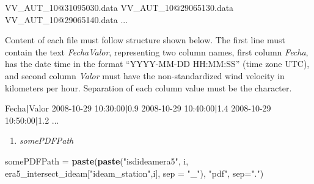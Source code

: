 \documentclass[12pt,twoside]{reedthesis}
\newenvironment{Shaded}{\begin{snugshade}}{\end{snugshade}}
\newcommand{\DataTypeTok}[1]{\textcolor[rgb]{0.13,0.29,0.53}{#1}}
\newcommand{\ExtensionTok}[1]{#1}
\newcommand{\KeywordTok}[1]{\textcolor[rgb]{0.13,0.29,0.53}{\textbf{#1}}}
\newcommand{\NormalTok}[1]{#1}
\newcommand{\StringTok}[1]{\textcolor[rgb]{0.31,0.60,0.02}{#1}}
\providecommand{\tightlist}{%
  \setlength{\itemsep}{0pt}\setlength{\parskip}{0pt}}
\begin{document}
\scriptsize

\vspace{0.4cm}
\begin{Shaded}
\begin{Highlighting}[]
      \ExtensionTok{VV_AUT_10@31095030.data}
      \ExtensionTok{VV_AUT_10@29065130.data}
      \ExtensionTok{VV_AUT_10@29065140.data}
      \ExtensionTok{...}
\end{Highlighting}
\end{Shaded}
\normalsize

Content of each file must follow structure shown below. The first line must contain the text \emph{Fecha\textbar Valor}, representing two column names, first column \emph{Fecha}, has the date time in the format ``YYYY-MM-DD HH:MM:SS'' (time zone UTC), and second column \emph{Valor} must have the non-standardized wind velocity in kilometers per hour. Separation of each column value must be the \emph{\textbar{}} character.

\scriptsize

\vspace{0.4cm}
\begin{Shaded}
\begin{Highlighting}[]
      \ExtensionTok{Fecha}\KeywordTok{|}\ExtensionTok{Valor}
      \ExtensionTok{2008-10-29}\NormalTok{ 10:30:00}\KeywordTok{|}\ExtensionTok{0.9}
      \ExtensionTok{2008-10-29}\NormalTok{ 10:40:00}\KeywordTok{|}\ExtensionTok{1.4}
      \ExtensionTok{2008-10-29}\NormalTok{ 10:50:00}\KeywordTok{|}\ExtensionTok{1.2}
      \ExtensionTok{...}
\end{Highlighting}
\end{Shaded}
\normalsize
\begin{enumerate}
\def\labelenumi{\arabic{enumi}.}
\setcounter{enumi}{5}
\tightlist
\item
  \emph{somePDFPath}
\end{enumerate}
\scriptsize

\vspace{0.4cm}
\begin{Shaded}
\begin{Highlighting}[]
\NormalTok{      somePDFPath =}\StringTok{ }\KeywordTok{paste}\NormalTok{(}\KeywordTok{paste}\NormalTok{(}\StringTok{"isdideamera5"}\NormalTok{, i, era5_intersect_ideam[}\StringTok{"ideam_station"}\NormalTok{,i], }\DataTypeTok{sep =} \StringTok{"_"}\NormalTok{), }
                          \StringTok{"pdf"}\NormalTok{, }\DataTypeTok{sep=}\StringTok{"."}\NormalTok{)}
\end{Highlighting}
\end{Shaded}
\normalsize
\end{document}
